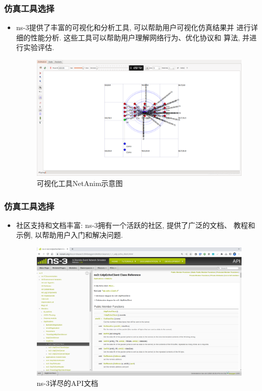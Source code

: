 \documentclass[10pt,mathserif]{beamer}%
\begin{document}
\begin{frame}[fragile]
	\frametitle{仿真工具选择}
	\begin{spacing}{1.5}
		\begin{itemize}
			\item ns-3提供了丰富的可视化和分析工具, 可以帮助用户可视化仿真结果并
				进行详细的性能分析. 这些工具可以帮助用户理解网络行为、优化协议和
				算法, 并进行实验评估. 
				\begin{figure}[htb]
					\centering
					\includegraphics[width=0.9\linewidth]{./images/net.png}
					\caption{可视化工具NetAnim示意图}
					\label{Fig:net}
				\end{figure}
		\end{itemize}
	\end{spacing}
\end{frame}

\begin{frame}[fragile]
	\frametitle{仿真工具选择}
	\setlength{\parindent}{2em}
	\begin{spacing}{1.5}
		\begin{itemize}
			\item 社区支持和文档丰富: ns-3拥有一个活跃的社区, 提供了广泛的文档、
				教程和示例, 以帮助用户入门和解决问题.
				\begin{figure}[htb]
					\centering
					\includegraphics[width=1\linewidth]{./images/pic.png}
					\caption{ns-3详尽的API文档}
					\label{Fig:pic}
				\end{figure}
		\end{itemize}
	\end{spacing}
\end{frame}
\end{document}
